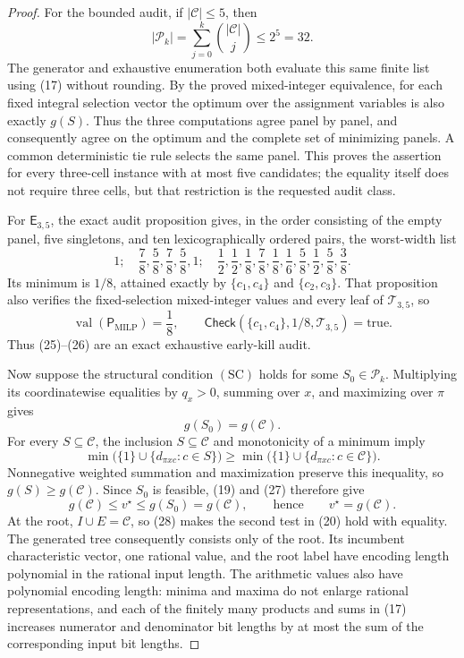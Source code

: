 \documentclass{article}
\begin{document}
\begin{proof}
For the bounded audit, if \(|\mathcal C|\leq5\), then
\[
|\mathcal P_k|=\sum_{j=0}^{k}{|\mathcal C|\choose j}\leq2^5=32.       \tag{24}
\]
The generator and exhaustive enumeration both evaluate this same finite
list using (17) without rounding.  By the proved mixed-integer equivalence,
for each fixed integral selection vector the optimum over the assignment
variables is also exactly \(g(S)\).  Thus the three computations agree
panel by panel, and consequently agree on the optimum and the complete set
of minimizing panels.  A common deterministic tie rule selects the same
panel.  This proves the assertion for every three-cell instance with at
most five candidates; the equality itself does not require three cells,
but that restriction is the requested audit class.

For \(\mathsf E_{3,5}\), the exact audit proposition gives, in the order
consisting of the empty panel, five singletons, and ten lexicographically
ordered pairs, the worst-width list
\[
1;\quad
\frac78,\frac58,\frac78,\frac58,1;\quad
\frac12,\frac12,\frac18,\frac78,\frac18,
\frac16,\frac58,\frac12,\frac58,\frac38.                              \tag{25}
\]
Its minimum is \(1/8\), attained exactly by
\(\{c_1,c_4\}\) and \(\{c_2,c_3\}\).  That proposition also verifies
the fixed-selection mixed-integer values and every leaf of
\(\mathcal T_{3,5}\), so
\[
\operatorname{val}(\mathsf P_{\mathrm{MILP}})=\frac18,
\qquad
\mathsf{Check}(\{c_1,c_4\},1/8,\mathcal T_{3,5})=\mathrm{true}.        \tag{26}
\]
Thus (25)--(26) are an exact exhaustive early-kill audit.

Now suppose the structural condition \(\mathrm{(SC)}\) holds for some
\(S_0\in\mathcal P_k\).  Multiplying its coordinatewise equalities by
\(q_x>0\), summing over \(x\), and maximizing over \(\pi\) gives
\[
g(S_0)=g(\mathcal C).                                                   \tag{27}
\]
For every \(S\subseteq\mathcal C\), the inclusion
\(S\subseteq\mathcal C\) and monotonicity of a minimum imply
\[
\min\bigl(\{1\}\cup\{d_{\pi xc}:c\in S\}\bigr)
\geq
\min\bigl(\{1\}\cup\{d_{\pi xc}:c\in\mathcal C\}\bigr).
\]
Nonnegative weighted summation and maximization preserve this inequality,
so \(g(S)\geq g(\mathcal C)\).  Since \(S_0\) is feasible, (19) and (27)
therefore give
\[
g(\mathcal C)\leq v^\star\leq g(S_0)=g(\mathcal C),
\qquad\text{hence}\qquad v^\star=g(\mathcal C).                      \tag{28}
\]
At the root, \(I\cup E=\mathcal C\), so (28) makes the second test in
(20) hold with equality.  The generated tree consequently consists only
of the root.  Its incumbent characteristic vector, one rational value, and
the root label have encoding length polynomial in the rational input
length.  The arithmetic values also have polynomial encoding length:
minima and maxima do not enlarge rational representations, and each of the
finitely many products and sums in (17) increases numerator and denominator
bit lengths by at most the sum of the corresponding input bit lengths.


\end{proof}
\end{document}
